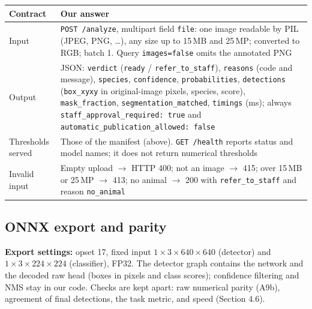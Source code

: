 \documentclass[11pt,a4paper]{article}
\begin{document}
\begin{tabularx}{\linewidth}{@{}l Y@{}}
\toprule
Contract & Our answer \\
\midrule
Input & \texttt{POST /analyze}, multipart field \texttt{file}: one image readable by PIL (JPEG, PNG, \ldots), any size up to 15\,MB and 25\,MP; converted to RGB; batch 1. Query \texttt{images=false} omits the annotated PNG \\
Output & JSON: \texttt{verdict} (\texttt{ready} / \texttt{refer\_to\_staff}), \texttt{reasons} (code and message), \texttt{species}, \texttt{confidence}, \texttt{probabilities}, \texttt{detections} (\texttt{box\_xyxy} in original-image pixels, species, score), \texttt{mask\_fraction}, \texttt{segmentation\_matched}, \texttt{timings} (ms); always \texttt{staff\_approval\_required: true} and \texttt{automatic\_publication\_allowed: false} \\
Thresholds served & Those of the manifest (above). \texttt{GET /health} reports status and model names; it does not return numerical thresholds \\
Invalid input & Empty upload $\rightarrow$ HTTP 400; not an image $\rightarrow$ 415; over 15\,MB or 25\,MP $\rightarrow$ 413; no animal $\rightarrow$ 200 with \texttt{refer\_to\_staff} and reason \texttt{no\_animal} \\
\bottomrule
\end{tabularx}

\subsection{ONNX export and parity}

\textbf{Export settings:} opset 17, fixed input $1\times3\times640\times640$ (detector) and $1\times3\times224\times224$ (classifier), FP32. The detector graph contains the network and the decoded raw head (boxes in pixels and class scores); confidence filtering and NMS stay in our code. Checks are kept apart: raw numerical parity (A9b), agreement of final detections, the task metric, and speed (Section 4.6).
\end{document}
